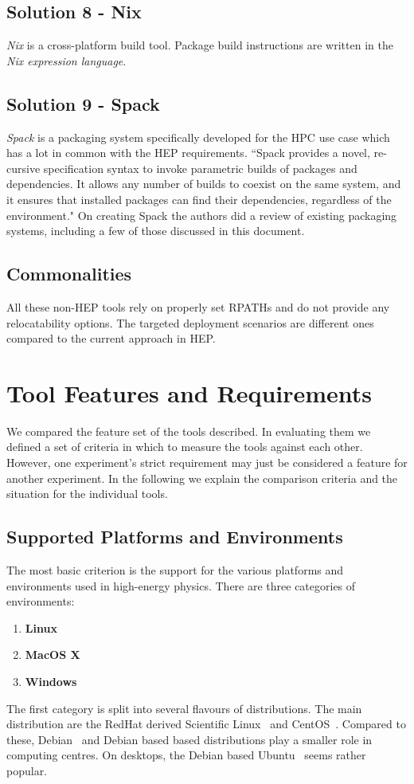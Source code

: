 \documentclass[12pt,a4paper]{article}
\begin{document}
\subsection{Solution 8 - Nix }
\emph{Nix}\cite{nix} is a cross-platform build tool. Package build instructions are written in the \emph{Nix expression language}.

\subsection{Solution 9 - Spack }
\emph{Spack}\cite{Spack} is a packaging system specifically developed for the HPC use case which has a lot in common with the HEP requirements.
``Spack provides a novel, re-cursive specification syntax to invoke parametric builds of packages and dependencies. It allows any number of builds to coexist on the same system, and it ensures that installed packages can find their dependencies, regardless of the environment." On creating Spack the authors did a review of existing packaging systems, including a few of those discussed in this document.

\subsection{Commonalities}
All these non-HEP tools rely on properly set RPATHs and do not provide any relocatability options. The targeted deployment scenarios are  different ones compared to the current approach in HEP. 

\section{Tool Features and Requirements}
We compared the feature set of the tools described. In evaluating them we defined a set of criteria in which to measure the tools against each other. However, one experiment's strict requirement may just be considered a feature for another experiment. In the following we explain the comparison criteria and the situation for the individual tools.

\subsection{Supported Platforms and Environments}
The most basic criterion is the support for the various platforms and environments used in high-energy physics. There are three categories of environments:
\begin{enumerate}
\item \textbf{Linux}
\item \textbf{MacOS X}
\item \textbf{Windows}
\end{enumerate}
The first category is split into several flavours of distributions. The main distribution are the RedHat derived Scientific Linux~\cite{sl} and CentOS~\cite{centos}. Compared to these, Debian~\cite{debian} and Debian based based distributions play a smaller role in computing centres. On desktops, the Debian based Ubuntu~\cite{ubuntu} seems rather popular.  
\end{document}
